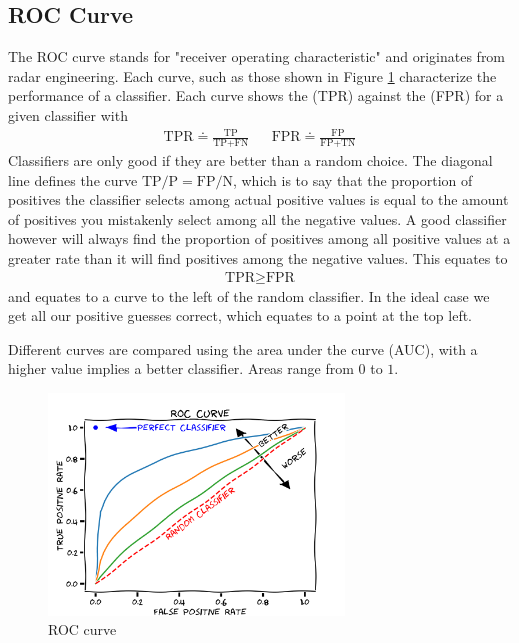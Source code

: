 \subsection{ROC Curve}
The ROC curve stands for "receiver operating characteristic" and originates from radar engineering. Each curve, such as those shown in Figure \ref{fig:roc-curve} characterize the performance of a classifier. Each curve shows the  (TPR) against the  (FPR) for a given classifier with
\begin{align}
    \textrm{TPR} \doteq \frac{\textrm{TP}}{\textrm{TP+FN}} && \textrm{FPR} \doteq \frac{\textrm{FP}}{\textrm{FP+TN}}
\end{align}
Classifiers are only good if they are better than a random choice. The diagonal line defines the curve $\textrm{TP}/\textrm{P} = \textrm{FP} /\textrm{N}$, which is to say that the proportion of positives the classifier selects among actual positive values is equal to the amount of positives you mistakenly select among all the negative values. A good classifier however will always find the proportion of positives among all positive values at a greater rate than it will find positives among the negative values. This equates to 
\begin{align}
        \textrm{TPR} \geq \textrm{FPR}
\end{align}
and equates to a curve to the left of the random classifier. In the ideal case
we get all our positive guesses correct, which equates to a point at the top left.

Different curves are compared using the area under the curve (AUC), with a higher value implies a better classifier. Areas range from $0$ to $1$.

\begin{figure}
\centerline{\includegraphics[width=0.7\textwidth]{mathematics/fig/rocCurve.png}}
\label{fig:roc-curve}
\caption{ROC curve}
\end{figure}

